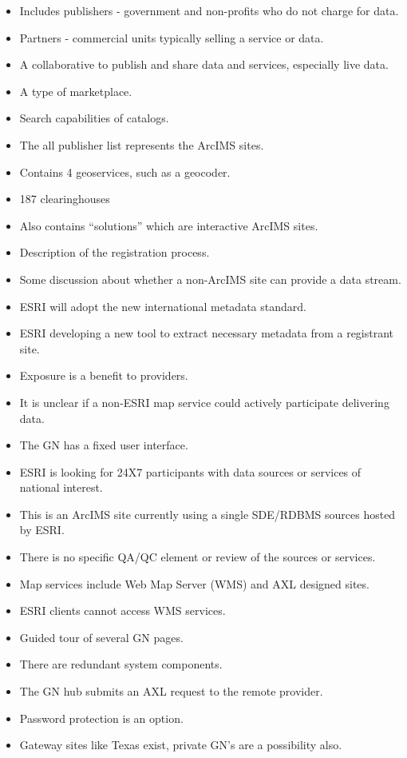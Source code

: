 \begin{itemize}
\item Includes publishers - government and non-profits who do not charge for data.
\item Partners - commercial units typically selling a service or data.
\item A collaborative to publish and share data and services, especially live data.
\item A type of marketplace.
\item Search capabilities of catalogs.
\item The all publisher list represents the ArcIMS sites.
\item Contains 4 geoservices, such as a geocoder.
\item 187 clearinghouses
\item Also contains ``solutions'' which are interactive ArcIMS sites.
\item Description of the registration process.
\item Some discussion about whether a non-ArcIMS site can provide a data stream.
\item ESRI will adopt the new international metadata standard.
\item ESRI developing a new tool to extract necessary metadata from a registrant site.
\item Exposure is a benefit to providers.
\item It is unclear if a non-ESRI map service could actively participate delivering data.
\item The GN has a fixed user interface.
\item ESRI is looking for 24X7 participants with data sources or services of national interest.
\item This is an ArcIMS site currently using a single SDE/RDBMS sources hosted by ESRI.
\item There is no specific QA/QC element or review of the sources or services.
\item Map services include Web Map Server (WMS) and AXL designed sites.
\item ESRI clients cannot access WMS services.
\item Guided tour of several GN pages.
\item There are redundant system components.
\item The GN hub submits an AXL request to the remote provider.
\item Password protection is an option.
\item Gateway sites like Texas exist, private GN's are a possibility also.

\end{itemize}
